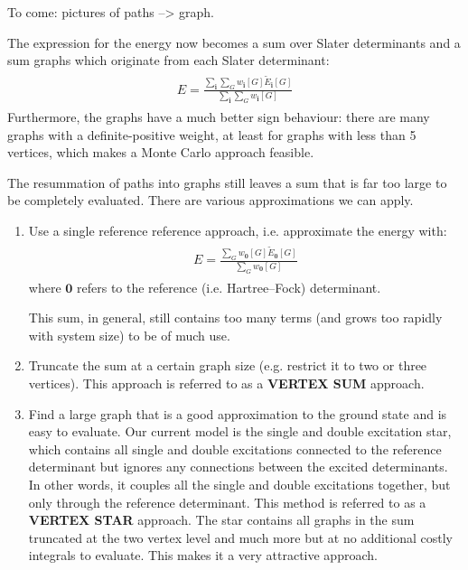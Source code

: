 \documentclass[openany,a4paper,10pt]{manual}
\newcommand{\veci}{\ensuremath{\mathbf{i}}}
\newcommand{\vecz}{\ensuremath{\mathbf{0}}}
\begin{document}
\begin{notice}[note]
To come: pictures of paths --\textgreater{} graph.
\end{notice}

The expression for the energy now becomes a sum over Slater determinants and a sum graphs which originate from each Slater determinant:
\begin{align}\begin{split}E = \frac{\sum_{\veci} \sum_G w_{\veci}[G] \tilde{E}_{\veci}[G]}{\sum_{\veci} \sum_G w_{\veci}[G]}\end{split}\end{align}
Furthermore, the graphs have a much better sign behaviour: there are many graphs with a definite-positive weight, at least for graphs with less than 5 vertices, which makes a Monte Carlo approach feasible.

The resummation of paths into graphs still leaves a sum that is far too
large to be completely evaluated.  There are various approximations we
can apply.
\begin{enumerate}
\item {} 
Use a single reference reference approach, i.e. approximate the
energy with:
\begin{align}\begin{split}E = \frac{\sum_G w_{\vecz}[G] \tilde{E}_{\vecz}[G]}{\sum_G w_{\vecz}[G]}\end{split}\end{align}
where $\vecz$ refers to the reference (i.e. Hartree--Fock)
determinant.

This sum, in general, still contains too many terms (and grows
too rapidly with system size) to be of much use.

\item {} 
Truncate the sum at a certain graph size (e.g. restrict it to
two or three vertices).  This approach is referred to as a
\textbf{VERTEX SUM} approach.

\item {} 
Find a large graph that is a good approximation to the ground state
and is easy to evaluate.  Our current model is the single and
double excitation star, which contains all single and double
excitations connected to the reference determinant but ignores any
connections between the excited determinants.  In other words,
it couples all the single and double excitations together,
but only through the reference determinant.  This method is
referred to as a \textbf{VERTEX STAR} approach.  The star contains all
graphs in the sum truncated at the two vertex level and much more but
at no additional costly integrals to evaluate.  This makes it a very
attractive approach.

\end{enumerate}
\end{document}
